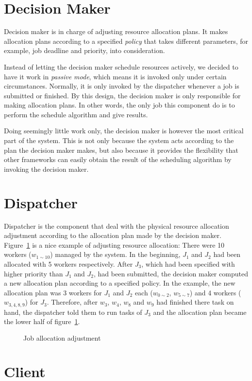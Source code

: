 \section{Decision Maker}

Decision maker is in charge of adjusting resource allocation plans.  It
makes allocation plans according to a specified \emph{policy} that takes
different parameters, for example, job deadline and priority, into
consideration. 

Instead of letting the decision maker schedule resources actively, we
decided to have it work in \emph{passive mode}, which means it is
invoked only under certain circumstances.  Normally, it is only invoked
by the dispatcher whenever a job is submitted or finished.  By this
design, the decision maker is only responsible for making allocation
plans.  In other words, the only job this component do is to perform the
schedule algorithm and give results.  

Doing seemingly little work only, the decision maker is however the most
critical part of the system. This is not only because the system acts
according to the plan the decision maker makes, but also because it
provides the flexibility that other frameworks can easily obtain the
result of the scheduling algorithm by invoking the decision maker.

\section{Dispatcher}

Dispatcher is the component that deal with the physical resource
allocation adjustment according to the allocation plan made by the
decision maker.  Figure~\ref{fig:allocation-adjustment} is a nice
example of adjusting resource allocation: There were 10 workers
($w_{1\sim10}$) managed by the system.  In the beginning, $J_1$ and
$J_2$ had been allocated with 5 workers respectively.  After $J_3$,
which had been specified with higher priority than $J_1$ and $J_2$, had
been submitted, the decision maker computed a new allocation plan
according to a specified policy.  In the example, the new allocation
plan was 3 workers for $J_1$ and $J_2$ each ($w_{0\sim2}$, $w_{5\sim7}$)
and 4 workers ($w_{3,4,8,9}$) for $J_3$.  Therefore, after $w_3$, $w_4$,
$w_8$ and $ w_9$ had finished there task on hand, the dispatcher told
them to run tasks of $J_3$ and the allocation plan became the lower half
of figure~\ref{fig:allocation-adjustment}.

\begin{figure}
  \centering
  
  \caption{Job allocation adjustment}
  \label{fig:allocation-adjustment}
\end{figure}

\section{Client}
